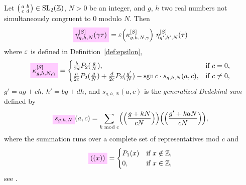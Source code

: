 \documentclass{article}
\begin{document}
\begin{Lemma}
  \label{thm:Generalized-Eta-Transformation-Schoeneberg}
  Let
  $\left(\begin{smallmatrix}a&b\\c&d\end{smallmatrix}\right) \in
  \SL2Z$, $N>0$ be an integer, and $g$, $h$ two real numbers not
  simultaneously congruent to 0 modulo $N$.
  Then
  \begin{gather}
    \label{eq:eta_g-h-N^[S](gamma*tau)}
    \defineNotation[eta-g-h-N-gamma-tau-Schoeneberg]%
      {\eta_{g,h,N}^{[S]}(\gamma\tau)}
    =
    \unityPower{\kappa_{g,h,N,\gamma}^{[S]}} \, \eta_{g',h',N}^{[S]}(\tau)
  \end{gather}
  where $\varepsilon$ is defined in Definition~\ref{def:epsilon},
  \begin{gather}
    \defineNotation[kappa-g-h-N-gamma-Schoeneberg]{\kappa_{g,h,N,\gamma}^{[S]}}
    =
    \begin{cases}
      \frac{b}{2d} P_2(\frac{g}{N}), &\text{if $c=0$},
      \\
      \frac{a}{2c} P_2(\frac{g}{N})
        + \frac{d}{2c} P_2(\frac{g'}{N})
        - \sign c \cdot s_{g,h,N}(a,c),
      &
      \text{if $c\not=0$},
    \end{cases}
    \label{eq:kappa_g-h-N-gamma-Schoeneberg}
  \end{gather}
  $g'=ag+ch$, $h'=bg+dh$, and $s_{g,h,N}(a,c)$ is the
  \emph{generalized Dedekind sum} defined by
  \begin{gather}
    \defineNotation[s-g-h-N]{s_{g,h,N}}(a,c)
    =
    \sum_{k \bmod c}
    \Bigl(\Bigl( \frac{g + k N}{c N} \Bigr)\Bigr)
    \Bigl(\Bigl( \frac{g' + k a N}{c N} \Bigr)\Bigr),
    \label{eq:s_g-h-N}
  \end{gather}
  where the summation runs over a complete set of representatives mod
  $c$ and
  \begin{gather*}
    \defineNotation[x-P1-0]{((x))}
    =
    \begin{cases}
      P_1(x) & \text{if $x\notin\setZ$},
      \\
      0, & \text{if $x \in \setZ$},
    \end{cases}
  \end{gather*}
  see \cite[p.~673]{Yang:GeneralizedDedekindEtaFunctions:2004}.
\end{Lemma}
\end{document}
